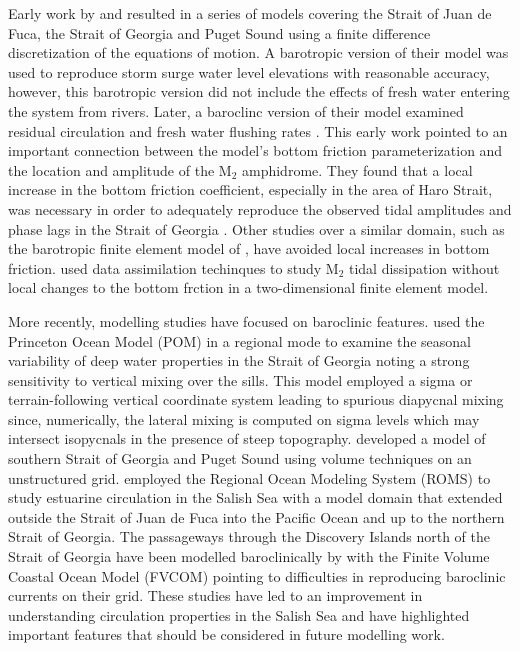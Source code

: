 \documentclass[pdftex,10pt]{article}
\begin{document}
Early work by \citet{crean1988mathematical,crean1988numerical} and \citet{stronach1993update} resulted in a series of models covering the Strait of Juan de Fuca, the Strait of Georgia and Puget Sound using a finite difference discretization of the equations of motion. A barotropic version of their model was used to reproduce storm surge water level elevations with reasonable accuracy, however, this barotropic version did not include the effects of fresh water entering the system from rivers. Later, a baroclinc version of their model examined residual circulation and fresh water flushing rates \citep{stronach1993update, marinone1996model}. This early work pointed to an important connection between the model's bottom friction parameterization and the location and amplitude of the M$_2$ amphidrome. They found that a local increase in the bottom friction coefficient, especially in the area of Haro Strait, was necessary in order to adequately reproduce the observed tidal amplitudes and phase lags in the Strait of Georgia \citep{stronach1993update}. Other studies over a similar domain, such as the barotropic finite element model of \citet{foreman1995tidal}, have avoided local increases in bottom friction. \citet{foreman2004m} used data assimilation techinques to study M$_2$ tidal dissipation without local changes to the bottom frction in a two-dimensional finite element model. 

More recently, modelling studies have focused on baroclinic features. \citet{masson2004modelling} used the Princeton Ocean Model (POM) in a regional mode to examine the seasonal variability of deep water properties in the Strait of Georgia noting a strong sensitivity to vertical mixing over the sills. This model employed a sigma or terrain-following vertical coordinate system leading to spurious diapycnal mixing since, numerically, the lateral mixing is computed on sigma levels which may intersect isopycnals in the presence of steep topography. \citet{yang2010multi} developed a model of southern Strait of Georgia and Puget Sound using volume techniques on an unstructured grid. \citet{sutherland2011model} employed the Regional Ocean Modeling System (ROMS) to study estuarine circulation in the Salish Sea with a model domain that extended outside the Strait of Juan de Fuca into the Pacific Ocean and up to the northern Strait of Georgia. The passageways through the Discovery Islands north of the Strait of Georgia have been modelled baroclinically by \citet{foreman2012circulation} with the Finite Volume Coastal Ocean Model (FVCOM) pointing to difficulties in reproducing baroclinic currents on their grid.  These studies have led to an improvement in understanding circulation properties in the Salish Sea and have highlighted important features that should be considered in future modelling work. 
\end{document}
